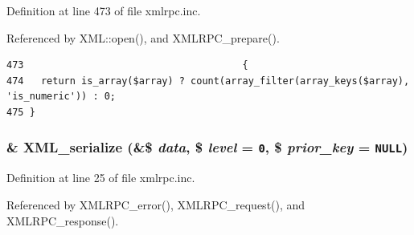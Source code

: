 Definition at line 473 of file xmlrpc.inc.

Referenced by XML::open(), and XMLRPC\_\-prepare().

\begin{Code}\begin{verbatim}473                                      {
474   return is_array($array) ? count(array_filter(array_keys($array), 'is_numeric')) : 0;
475 }
\end{verbatim}
\end{Code}


\hypertarget{xmlrpc_8inc_a1e9b05a06f28fabb86c10129f5890ef}{
\subsubsection{\setlength{\rightskip}{0pt plus 5cm}\& XML\_\-serialize (\&\$ {\em data}, \$ {\em level} = {\tt 0}, \$ {\em prior\_\-key} = {\tt NULL})}}
\label{xmlrpc_8inc_a1e9b05a06f28fabb86c10129f5890ef}




Definition at line 25 of file xmlrpc.inc.

Referenced by XMLRPC\_\-error(), XMLRPC\_\-request(), and XMLRPC\_\-response().

